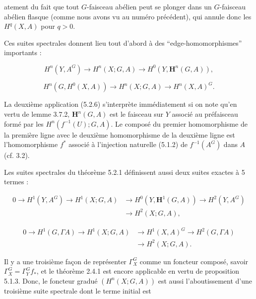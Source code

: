 \clearpage
{}

\noindent atement du fait que tout $G$-faisceau abélien peut se plonger dans
un $G$-faisceau abélien flasque (comme nous avons vu au numéro précédent),
qui annule donc les $H^q(X,A)$ pour $q>0$.

Ces suites spectrales donnent lieu tout d'abord à des
``edge-homomorphismes'' importants :

\[
H^n(Y,A^G)\to H^n(X;G,A)
\to H^0(Y,\mathbf H^n(G,A)),
\tag{5.2.6}
\]

\[
H^n(G,H^0(X,A))\to H^n(X;G,A)
\to H^n(X,A)^G.
\tag{5.2.7}
\]

La deuxième application (5.2.6) s'interprète immédiatement si on note qu'en
vertu de lemme 3.7.2, $\mathbf H^n(G,A)$ est le faisceau sur $Y$ associé au
préfaisceau formé par les $H^n(f^{-1}(U);G,A)$. Le composé du premier
homomorphisme de la première ligne avec le deuxième homomorphisme de la
deuxième ligne est l'homomorphisme $f^*$ associé à l'injection naturelle
(5.1.2) de $f^{-1}(A^G)$ dans $A$ (cf. 3.2).

Les suites spectrales du théorème 5.2.1 définissent aussi deux suites exactes
à 5 termes :

\[
\tag{5.2.8}
\begin{aligned}
0\to H^1(Y,A^G)\to H^1(X;G,A)
&\to H^0(Y,\mathbf H^1(G,A))\to H^2(Y,A^G)\\
&\to H^2(X;G,A),
\end{aligned}
\]

\[
\tag{5.2.9}
\begin{aligned}
0\to H^1(G,\Gamma A)\to H^1(X;G,A)
&\to H^1(X,A)^G\to H^2(G,\Gamma A)\\
&\to H^2(X;G,A).
\end{aligned}
\]

Il y a une troisième façon de représenter $\Gamma_X^G$ comme un foncteur
composé, savoir $\Gamma_X^G=\Gamma_Y^Gf_*$, et le théorème 2.4.1 est encore
applicable en vertu de proposition 5.1.3. Donc, le foncteur gradué
$(H^n(X;G,A))$ est aussi l'aboutissement d'une troisième suite spectrale dont
le terme initial est

